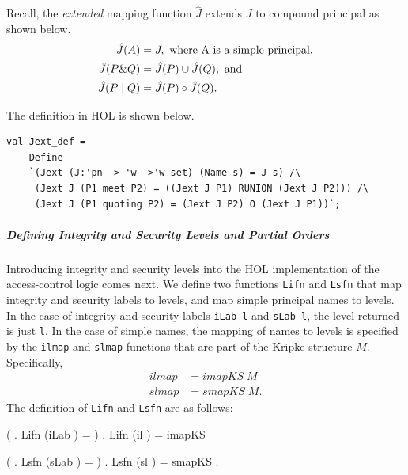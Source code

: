 Recall, the \emph{extended} mapping function $\hat{J}$ extends $J$ to
compound principal as shown below.
\begin{align*}
  \hat{J}(A) &= J, \text{ where A is a simple principal},\\
  \hat{J}(P \& Q) &= \hat{J}(P) \cup \hat{J}(Q), \text{ and}\\
  \hat{J}(P \mid Q) &= \hat{J}(P) \circ \hat{J}(Q).
\end{align*}

The definition in HOL is shown below.
\begin{session}
\begin{verbatim}
val Jext_def =
    Define
    `(Jext (J:'pn -> 'w ->'w set) (Name s) = J s) /\
     (Jext J (P1 meet P2) = ((Jext J P1) RUNION (Jext J P2))) /\
     (Jext J (P1 quoting P2) = (Jext J P2) O (Jext J P1))`;
\end{verbatim}
\end{session}

\subparagraph{Defining Integrity and Security Levels and Partial
  Orders}

Introducing integrity and security levels into the HOL implementation
of the access-control logic comes next. We define two functions
\texttt{Lifn} and \texttt{Lsfn} that map integrity and security labels
to levels, and map simple principal names to levels. In the case of
integrity and security labels \texttt{iLab l} and \texttt{sLab l}, the
level returned is just \texttt{l}.  In the case of simple names, the
mapping of names to levels is specified by the \texttt{ilmap} and
\texttt{slmap} functions that are part of the Kripke structure $M$.
Specifically,
\begin{align*}
  ilmap &= imapKS \;M\\
  slmap &= smapKS \;M.
\end{align*}
The definition of \texttt{Lifn} and \texttt{Lsfn} are as follows:

\HOLTokenTurnstile{} (\HOLTokenForall{}\HOLBoundVar{M}
. Lifn  (iLab ) =
\HOLBoundVar{l}) \HOLTokenConj{}
\HOLTokenForall{} . Lifn  (il ) = imapKS \HOLBoundVar{M} \HOLBoundVar{name}

\HOLTokenTurnstile{} (\HOLTokenForall{}\HOLBoundVar{M}
. Lsfn  (sLab ) =
\HOLBoundVar{l}) \HOLTokenConj{} \HOLTokenForall{}
. Lsfn \HOLBoundVar{M} (sl \HOLBoundVar{name}) =
smapKS \HOLBoundVar{M} \HOLBoundVar{name}.

